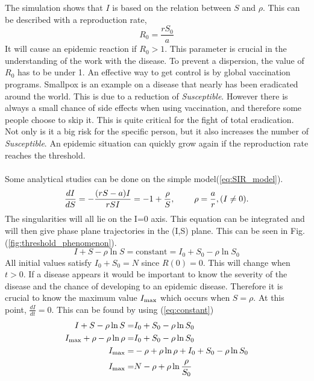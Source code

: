 \documentclass[%
twoside,                 %
final,                   %
chapterprefix=true,      %
open=right               %
10pt]{book}
\begin{document}
The simulation shows that $I$ is based on the relation between $S$ and $\rho$. This can be described with a reproduction rate,
\begin{equation}
R_0 = \frac{rS_0}{a}
\end{equation}
It will cause an epidemic reaction if $R_0 > 1$. This parameter is crucial in the understanding of the work with the disease. To prevent a dispersion, the value of $R_0$ has to be under 1. An effective way to get control is by global vaccination programs. Smallpox is an example on a disease that nearly has been eradicated around the world. This is due to a reduction of \emph{Susceptible}. However there is always a small chance of side effects when using vaccination, and therefore some people choose to skip it. This is quite critical for the fight of total eradication. Not only is it a big risk for the specific person, but it also increases the number of \emph{Susceptible}. An epidemic situation can quickly grow again if the reproduction rate reaches the threshold.
\\
\\
Some analytical studies can be done on the simple model(\ref{eq:SIR_model}).
\begin{equation} 
\frac{dI}{dS} = -\frac{(rS-a)I}{rSI} = -1 + \frac{\rho}{S},\hspace{8mm}\rho=\frac{a}{r}, (I\neq0).
\end{equation}
The singularities will all lie on the I=0 axis. This equation can be integrated and will then give phase plane trajectories in the (I,S) plane. This can be seen in Fig.(\ref{fig:threshold_phenomenon}).
\begin{equation} \label{eq:constant}
I+S-\rho \ln S = \textrm{constant} = I_0 + S_0 - \rho \ln S_0
\end{equation}
All initial values satisfy $I_0+S_0=N$ since $R(0) = 0$. This will change when $t>0$. If a disease appears it would be important to know the severity of the disease and the chance of developing to an epidemic disease. Therefore it is crucial to know the maximum value $I_{\textrm{max}}$ which occurs when $S=\rho$. At this point, $\frac{dI}{dt}=0$. This can be found by using (\ref{eq:constant})
\begin{align} 
I+S-\rho \ln S =& I_0 + S_0 - \rho \ln S_0 \nonumber \\
I_{\textrm{max}}+\rho-\rho \ln \rho =& I_0 + S_0 - \rho \ln S_0\nonumber \\
I_{\textrm{max}}=&- \rho+\rho \ln \rho + I_0 + S_0 - \rho \ln S_0\nonumber \\
I_{\textrm{max}}=&N - \rho + \rho \ln\frac{\rho}{S_0} \label{eq:max_I}
\end{align}
\end{document}
